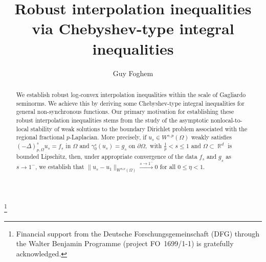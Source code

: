 \documentclass[12pt, reqno]{amsart}%
\theoremstyle{plain}  %
\theoremstyle{definition}  %
\theoremstyle{remark}
\numberwithin{equation}{section}
\DeclareMathOperator{\R}{\mathbb{R}}
\begin{document}
\title{Robust interpolation inequalities via Chebyshev-type integral inequalities}

\author{Guy Foghem}
\address{{\tiny Brandenburgische Technische Universit\"at Cottbus--Senftenberg, Fakult\"{a}t 1: MINT Fachgebiet Mathematik, Platz der Deutschen Einheit 1, 03046 Cottbus, Germany.} \href{https://orcid.org/0000-0002-8917-7309}{ORCID}}
\thanks{Financial support from the Deutsche Forschungsgemeinschaft (DFG) through the Walter Benjamin Programme (project FO~1699/1-1) is gratefully acknowledged.}


\begin{abstract}
We establish  robust log-convex interpolation inequalities within the scale of Gagliardo seminorms. We achieve this by  deriving some Chebyshev-type integral inequalities for general non-synchronous functions. Our primary motivation for establishing these robust interpolation inequalities stems from the study of the asymptotic nonlocal-to-local stability of weak solutions to the boundary  Dirichlet problem associated with the regional fractional $p$-Laplacian. More precisely, if $u_s \in W^{s,p}(\Omega)$ weakly satisfies $(-\Delta)_{p, \Omega}^s u_s = f_s $ in $\Omega$ and $ \gamma^s_0(u_s) = g_s$ on  $\partial\Omega,$  with $\frac{1}{p} < s \leq 1$  and  $\Omega \subset \R^d$ is bounded Lipschitz, then, under appropriate convergence of the data $f_s$ and $g_s$ as $s \to 1^-$, we establish that  $\| u_s - u_1 \|_{W^{\eta,p}(\Omega)} \xrightarrow{s \to 1^-} 0 $ for all $0 \leq \eta < 1$.
\end{abstract}



\maketitle
\end{document}
